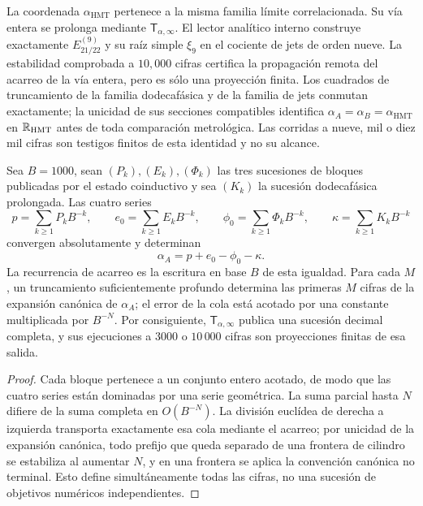 La coordenada \(\alpha_{\mathrm{HMT}}\) pertenece a la misma familia límite
correlacionada. Su vía entera se prolonga mediante
\(\mathsf T_{\alpha,\infty}\). El lector
analítico interno construye exactamente \(E_{21/22}^{(9)}\) y su raíz simple
\(\xi_9\) en el cociente de jets de orden nueve. La estabilidad comprobada a
\(10,000\) cifras certifica la propagación remota del acarreo de la vía
entera, pero es sólo una proyección finita. Los cuadrados de truncamiento de
la familia dodecafásica y de la familia de jets conmutan exactamente; la
unicidad de sus secciones compatibles identifica
\(\alpha_A=\alpha_B=\alpha_{\mathrm{HMT}}\) en
\(\mathbb R_{\rm HMT}\) antes de toda comparación metrológica. Las corridas a
nueve, mil o diez mil cifras son testigos finitos de esta identidad y no su
alcance.

\begin{proposition}
\label{prop:c27-alpha-prolongacion-completa}
Sea \(B=1000\), sean \((P_k),(E_k),(\Phi_k)\) las tres sucesiones de bloques
publicadas por el estado coinductivo y sea \((K_k)\) la sucesión
dodecafásica prolongada. Las cuatro series
\[
 p=\sum_{k\geq1}P_kB^{-k},\qquad
 e_0=\sum_{k\geq1}E_kB^{-k},\qquad
 \phi_0=\sum_{k\geq1}\Phi_kB^{-k},\qquad
 \kappa=\sum_{k\geq1}K_kB^{-k}
\]
convergen absolutamente y determinan
\[
 \alpha_A=p+e_0-\phi_0-\kappa.
\]
La recurrencia de acarreo es la escritura en base \(B\) de esta igualdad.
Para cada \(M\), un truncamiento suficientemente profundo determina las
primeras \(M\) cifras de la expansión canónica de \(\alpha_A\); el error de
la cola está acotado por una constante multiplicada por \(B^{-N}\). Por
consiguiente, \(\mathsf T_{\alpha,\infty}\) publica una sucesión decimal
completa, y sus ejecuciones a \(3000\) o \(10\,000\) cifras son proyecciones
finitas de esa salida.
\end{proposition}

\begin{proof}
Cada bloque pertenece a un conjunto entero acotado, de modo que las cuatro
series están dominadas por una serie geométrica. La suma parcial hasta \(N\)
difiere de la suma completa en \(O(B^{-N})\). La división euclídea de
derecha a izquierda transporta exactamente esa cola mediante el acarreo;
por unicidad de la expansión canónica, todo prefijo que queda separado de
una frontera de cilindro se estabiliza al aumentar \(N\), y en una frontera
se aplica la convención canónica no terminal. Esto define simultáneamente
todas las cifras, no una sucesión de objetivos numéricos independientes.
\end{proof}

